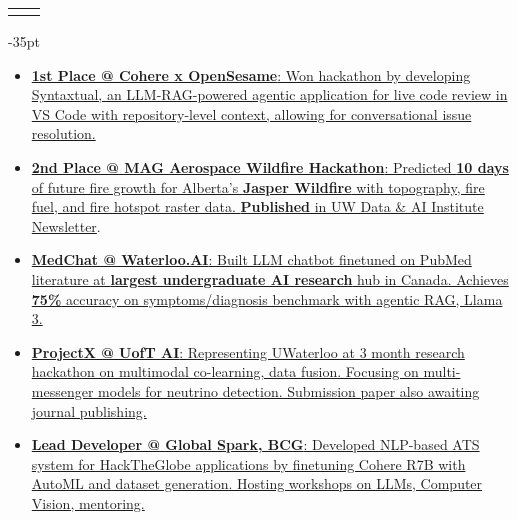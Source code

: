 \documentclass[letterpaper,11pt]{article}
\makeatletter
\newcommand{\resumeItem}[1]{
  \item\small{
    {#1 \vspace{-2pt}}
  }
}
\newcommand{\resumeProjectHeading}[2]{
    \item
    \begin{tabular*}{1.001\textwidth}{l@{\extracolsep{\fill}}r}
      \small#1 & \textbf{\small #2}\\
    \end{tabular*}\vspace{-7pt}
}
\newcommand{\resumeItemListStart}{\begin{itemize}}
\newcommand{\resumeItemListEnd}{\end{itemize}\vspace{-5pt}}
\makeatother
\begin{document}
        \resumeProjectHeading
          {\href{}{}  \medium{\textcolor{cvblue}{}{}}}

          \vspace{-35pt}
           
          \resumeItemListStart

        \resumeItem{\href{https://github.com/Duo-Keyboard-Koalition/Syntaxtual}{\textcolor{cvblue}{\textbf{{1st Place @ Cohere x OpenSesame}}}: Won hackathon by developing Syntaxtual, an LLM-RAG-powered agentic application for live code review in VS Code with repository-level context, allowing for conversational issue resolution.}}

        \vspace{5pt}



        \resumeItem{\href{https://github.com/m-bilu/MAG-WildfireHackathon}{\textcolor{cvblue}{\textbf{{2nd Place @ MAG Aerospace Wildfire Hackathon}}}: Predicted \textbf{10 days} of future fire growth for Alberta's \textbf{Jasper Wildfire} with topography, fire fuel, and fire hotspot raster data. \textbf{Published} in UW Data \& AI Institute 
 {\href{shorturl.at/wdxOb}{\textcolor{cvblue}{Newsletter}}}}.}
        
        \vspace{5pt}

        \resumeItem{\href{https://watai.ca/#/contact}{\textcolor{cvblue}{\textbf{{MedChat @ Waterloo.AI}}}: Built LLM chatbot finetuned on PubMed literature at \textbf{largest undergraduate AI research} hub in Canada. Achieves \textbf{75\%} accuracy on symptoms/diagnosis benchmark with agentic RAG, Llama 3.}}

        \vspace{5pt}

        \resumeItem{\href{https://www.uoft.ai/projectx}{\textcolor{cvblue}{\textbf{{ProjectX @ UofT AI}}}: Representing UWaterloo at 3 month research hackathon on multimodal co-learning, data fusion. Focusing on multi-messenger models for neutrino detection. Submission paper also awaiting journal publishing.}}
        
        \vspace{5pt} 


        \resumeItem{\href{https://globalspark.world/}{\textcolor{cvblue}{\textbf{{Lead Developer @ Global Spark, BCG}}}: Developed NLP-based ATS system for HackTheGlobe applications by finetuning Cohere R7B with AutoML and dataset generation. Hosting workshops on LLMs, Computer Vision, mentoring.}}
        
        \vspace{5pt} 

        
          \resumeItemListEnd 
         \vspace{-12pt}


    \vspace{-5pt}
  
\end{document}
